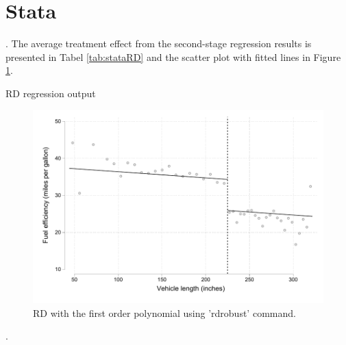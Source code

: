\documentclass{article}
\begin{document}
\section{Stata}

. The average treatment effect from the second-stage regression results is presented in Tabel \ref{tab:stataRD} and the scatter plot with fitted lines in Figure \ref{fig:StataScatter}. 

\begin{table}[h]
    \centering
    
    \caption{RD regression output}
    \label{tab:stataRD}
\end{table}



\begin{figure}[h!]
    \centering
    \includegraphics{homework 7/output/figure/ScatterRD.pdf}
    \caption{RD with the first order polynomial using 'rdrobust' command.}
    \label{fig:StataScatter}
\end{figure}


. 
\end{document}
